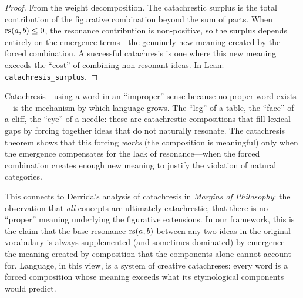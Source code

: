 \begin{proof}
From the weight decomposition.  The catachrestic surplus is the total contribution of the figurative combination beyond the sum of parts.  When $\mathrm{rs}(a, b) \leq 0$, the resonance contribution is non-positive, so the surplus depends entirely on the emergence terms---the genuinely new meaning created by the forced combination.  A successful catachresis is one where this new meaning exceeds the ``cost'' of combining non-resonant ideas.  In Lean: \texttt{catachresis\_surplus}.
\end{proof}

\begin{interpretation}
\label{interp:catachresis-creativity}
Catachresis---using a word in an ``improper'' sense because no proper word exists---is the mechanism by which language grows.  The ``leg'' of a table, the ``face'' of a cliff, the ``eye'' of a needle: these are catachrestic compositions that fill lexical gaps by forcing together ideas that do not naturally resonate.  The catachresis theorem shows that this forcing \emph{works} (the composition is meaningful) only when the emergence compensates for the lack of resonance---when the forced combination creates enough new meaning to justify the violation of natural categories.

This connects to Derrida's analysis of catachresis in \textit{Margins of Philosophy}: the observation that \emph{all} concepts are ultimately catachrestic, that there is no ``proper'' meaning underlying the figurative extensions.  In our framework, this is the claim that the base resonance $\mathrm{rs}(a, b)$ between any two ideas in the original vocabulary is always supplemented (and sometimes dominated) by emergence---the meaning created by composition that the components alone cannot account for.  Language, in this view, is a system of creative catachreses: every word is a forced composition whose meaning exceeds what its etymological components would predict.
\end{interpretation}

